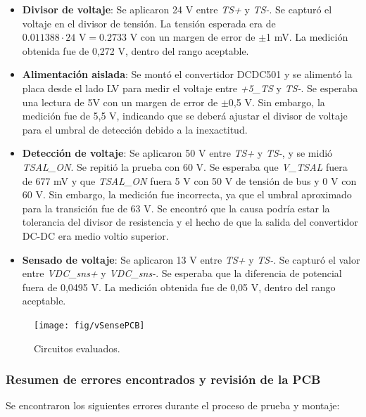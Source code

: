 \begin{itemize}
	\item \textbf{Divisor de voltaje}: Se aplicaron 24 V entre \textit{TS+} y \textit{TS-}. Se capturó el voltaje en el divisor de tensión. La tensión esperada era de $0.011388 \cdot 24\text{ V} = 0.2733 \text{ V}$ con un margen de error de $\pm$1 mV. La medición obtenida fue de 0,272 V, dentro del rango aceptable.
	
	\item \textbf{Alimentación aislada}: Se montó el convertidor DCDC501 y se alimentó la placa desde el lado LV para medir el voltaje entre \textit{+5\_TS} y \textit{TS-}. Se esperaba una lectura de 5V con un margen de error de $\pm$0,5 V. Sin embargo, la medición fue de 5,5 V, indicando que se deberá ajustar el divisor de voltaje para el umbral de detección debido a la inexactitud.
	
	\item \textbf{Detección de voltaje}: Se aplicaron 50 V entre \textit{TS+} y \textit{TS-}, y se midió \textit{TSAL\_ON}. Se repitió la prueba con 60 V. Se esperaba que \textit{V\_TSAL} fuera de 677 mV y que \textit{TSAL\_ON} fuera 5 V con 50 V de tensión de bus y 0 V con 60 V. Sin embargo, la medición fue incorrecta, ya que el umbral aproximado para la transición fue de 63 V. Se encontró que la causa podría estar la tolerancia del divisor de resistencia y el hecho de que la salida del convertidor DC-DC era medio voltio superior.

	\item \textbf{Sensado de voltaje}: Se aplicaron 13 V entre \textit{TS+} y \textit{TS-}. Se capturó el valor entre \textit{VDC\_sns+} y \textit{VDC\_sns-}. Se esperaba que la diferencia de potencial fuera de 0,0495 V. La medición obtenida fue de 0,05 V, dentro del rango aceptable.
\end{itemize}

\begin{figure}[H]
	\centering
	\texttt{[image: fig/vSensePCB]}
	\caption{Circuitos evaluados.}
\end{figure}


\subsubsection{Resumen de errores encontrados y revisión de la PCB}

Se encontraron los siguientes errores durante el proceso de prueba y montaje:

